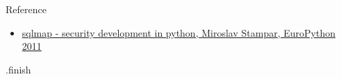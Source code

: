\documentclass[xcolor=pdftex,table,10pt]{beamer}
\begin{document}
\begin{frame}
	\begin{center}
		\LARGE{Reference} \\
	\end{center}
	\begin{itemize}
		\item \href{http://www.slideshare.net/stamparm/euro-python-2011miroslavstamparsqlmapsecuritydevelopmentinpython}{sqlmap - security development in python, Miroslav Stampar, EuroPython 2011}
	
	\end{itemize}	
\end{frame}

\begin{frame}
\begin{center}
\LARGE \textrm{.finish}
\end{center}
\end{frame}	
\end{document}
